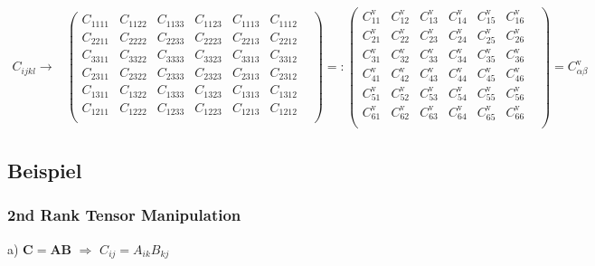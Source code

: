 \documentclass[a4paper]{scrartcl}
\begin{document}
 \begin{align} C_{ijkl} \longrightarrow& \begin{pmatrix} C_{1111} & C_{1122} &
C_{1133} & C_{1123} & C_{1113} & C_{1112} & \\ C_{2211} & C_{2222} & C_{2233} &
C_{2223} & C_{2213} & C_{2212} & \\ C_{3311} & C_{3322} & C_{3333} & C_{3323} &
C_{3313} & C_{3312} & \\ C_{2311} & C_{2322} & C_{2333} & C_{2323} & C_{2313} &
C_{2312} & \\ C_{1311} & C_{1322} & C_{1333} & C_{1323} & C_{1313} & C_{1312} &
\\ C_{1211} & C_{1222} & C_{1233} & C_{1223} & C_{1213} & C_{1212} & \\
\end{pmatrix}=: \begin{pmatrix} C_{11}^{\text{v}} & C_{12}^{\text{v}} &
C_{13}^{\text{v}} & C_{14}^{\text{v}} & C_{15}^{\text{v}} & C_{16}^{\text{v}} &
\\ C_{21}^{\text{v}} & C_{22}^{\text{v}} & C_{23}^{\text{v}} & C_{24}^{\text{v}}
&  C_{25}^{\text{v}} & C_{26}^{\text{v}} & \\ C_{31}^{\text{v}} &
C_{32}^{\text{v}}  & C_{33}^{\text{v}} & C_{34}^{\text{v}} & C_{35}^{\text{v}} &
C_{36}^{\text{v}} & \\ C_{41}^{\text{v}} & C_{42}^{\text{v}} & C_{43}^{\text{v}}
& C_{44}^{\text{v}} & C_{45}^{\text{v}} & C_{46}^{\text{v}} & \\
C_{51}^{\text{v}}  & C_{52}^{\text{v}} & C_{53}^{\text{v}} & C_{54}^{\text{v}} &
C_{55}^{\text{v}} & C_{56}^{\text{v}} & \\ C_{61}^{\text{v}} & C_{62}^{\text{v}}
& C_{63}^{\text{v}} & C_{64}^{\text{v}} & C_{65}^{\text{v}} & C_{66}^{\text{v}}
&  \\ \end{pmatrix} =C^{\text{v}}_{\alpha\beta} \end{align}

\subsection{Beispiel}

\subsubsection{2nd Rank Tensor Manipulation}

a) $\mathbf{C}=\mathbf{AB}$ $\Rightarrow$ $C_{ij}=A_{ik}B_{kj}$
\end{document}
